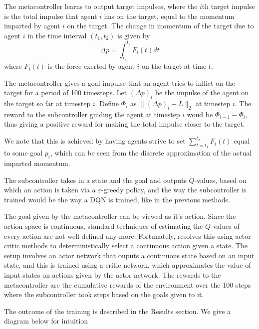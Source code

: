 \documentclass{article}
\begin{document}
The metacontroller learns to output target
impulses, where the $i$th target impulse is the total impulse
that agent $i$ has on the target, equal to the momentum
imparted by agent $i$ on the target. The change in momentum of the target due to
agent $i$ in the time interval $(t_1,t_2)$ is given by
\[
\Delta p = \int_{t_1}^{t_2} F_i(t)dt
\]
where $F_i(t)$ is the force exerted by agent $i$ on the target at time $t$.


The metacontroller gives a goal impulse that an agent tries to inflict on the target
for a period of 100 timesteps. Let $(\Delta p)_i$ be the impulse of the agent
on the target so far at timestep $i$. Define $\Phi_i$ as $\|(\Delta p)_i - L\|_2$ at timestep $i$.
The reward to the subcontroller guiding the agent at timestep $i$ woud be
$\Phi_{i-1}-\Phi_i$, thus giving a positive reward for making the total impulse
closer to the target.

We note that this is achieved by having agents strive to set $\sum_{t=t_1}^{t_2}F_i(t)$
equal to some goal $p_i$, which can be seen from the discrete approximation of
the actual imparted momentum.

The subcontroller takes in a state and the goal and outputs $Q$-values, based on which
an action is taken via a $\varepsilon$-greedy policy, and the way the subcontroller is
trained would be the way a DQN is trained, like in the previous methods.

The goal given by the metacontroller can be viewed as it's action. Since the action
space is continuous, standard techniques of estimating the $Q$-values of every action
are not well-defined any more. Fortunately, \cite{lillicrap2015continuous} resolves
this using actor-critic methods to deterministically select a continuous action
given a state. The setup involves an actor network that ouputs a continuous state based
on an input state, and this is trained using a critic network, which approximates the
value of input states on actions given by the actor network. The rewards to the metacontroller
are the cumulative rewards of the environment over the 100 steps where the subcontroller
took steps based on the goals given to it.

The outcome of the training is described in the Results section. We give a diagram below for intuition
\end{document}
